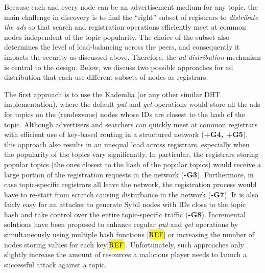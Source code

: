 Because each and every node can be an advertisement medium for any topic, the main challenge in discovery is to find the ``right'' subset of registrars to \textit{distribute the ads} so that search and registration operations efficiently meet at common nodes independent of the topic popularity. The choice of the subset also determines the level of load-balancing across the peers, and consequently it impacts the security as discussed above. Therefore, the \textit{ad distribution} mechanism is central to the \sysname design. Below, we discuss two possible approaches for ad distribution that each use different subsets of nodes as registrars. 



The first approach is to use the Kademlia (or any other similar DHT implementation), where the default \emph{put} and \emph{get} operations would store all the ads for topics on the (rendezvous) nodes whose IDs are closest to the hash of the topic. Although advertisers and searchers can quickly meet at common registrars with efficient use of key-based routing in a structured network (\textbf{+G4, +G5}), this approach also results in an unequal load across registrars, especially when the popularity of the topics vary significantly. In particular, the registrars storing popular topics (\ie the ones closest to the hash of the popular topics) would receive a large portion of the registration requests in the network (\textbf{-G3}). Furthermore, in case topic-specific registrars all leave the network, the registration process would have to re-start from scratch causing disturbance in the network (\textbf{-G7}). It is also fairly easy for an attacker to generate Sybil nodes with IDs close to the topic hash and take control over the entire topic-specific traffic (\textbf{-G8}). Incremental solutions have been  proposed to enhance regular \emph{put} and \emph{get} operations by simultaneously using multiple hash functions [\hl{REF}] or increasing the number of nodes storing values for each key[\hl{REF}]. Unfortunately, such approaches only slightly increase the amount of resources a malicious player needs to launch a successful attack against a topic. 

